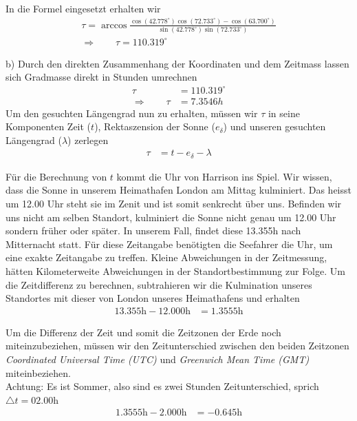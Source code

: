 \begin{refsection}
In die Formel eingesetzt erhalten wir
\begin{align*}
\tau = \arccos 
\frac{ \cos(42.778^{\circ}) \cos(72.733^{\circ}) - \cos(63.700^{\circ})} {\sin(42.778^{\circ})\sin(72.733^{\circ})} \\
\Rightarrow \quad \quad
\tau = 110.319^{\circ} 
\end{align*}

b) \quad  Durch den direkten Zusammenhang der Koordinaten und dem Zeitmass lassen sich Gradmasse direkt in Stunden umrechnen
\begin{align*}
\tau &= 110.319^{\circ} \\
\Rightarrow \quad \quad
\tau &= 7.3546h
\end{align*}
Um den gesuchten Längengrad nun zu erhalten, müssen wir $\tau$ in seine Komponenten Zeit ($t$), Rektaszension der Sonne ($e_\delta$) und unseren gesuchten Längengrad ($\lambda$) zerlegen
\begin{align*}
\tau &= t - e_\delta - \lambda 
\end{align*}


Für die Berechnung von $t$ kommt die Uhr von Harrison ins Spiel. Wir wissen, dass die Sonne in unserem Heimathafen London am Mittag kulminiert. Das heisst um 12.00 Uhr steht sie im Zenit und ist somit senkrecht über uns. 
Befinden wir uns nicht am selben Standort, kulminiert die Sonne nicht genau um 12.00 Uhr sondern früher oder später.
In unserem Fall, findet diese 13.355h nach Mitternacht statt. Für diese Zeitangabe benötigten die Seefahrer die Uhr, um eine exakte Zeitangabe zu treffen. Kleine Abweichungen in der Zeitmessung, hätten Kilometerweite Abweichungen in der Standortbestimmung zur Folge.
Um die Zeitdifferenz zu berechnen, subtrahieren wir die Kulmination unseres Standortes mit dieser von London unseres Heimathafens und erhalten
\begin{align*}
13.355 \text{h} - 12.000 \text{h} &= 1.3555 \text{h}
\end{align*}

Um die Differenz der Zeit und somit die Zeitzonen der Erde noch miteinzubeziehen, müssen wir den Zeitunterschied zwischen den beiden Zeitzonen \textit{Coordinated Universal Time (UTC)} und \textit{Greenwich Mean Time (GMT)} miteinbeziehen. \\
Achtung: Es ist Sommer, also sind es zwei Stunden Zeitunterschied, sprich $\triangle{t}=02.00$h
\begin{align*}
1.3555 \text{h} - 2.000 \text{h} &= -0.645 \text{h}
\end{align*}


\end{refsection}
